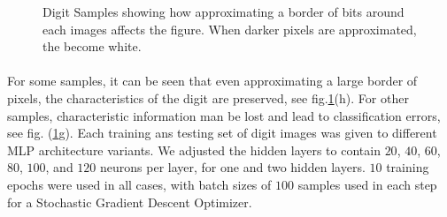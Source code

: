 \documentclass[12pt,letterpaper]{article}
\begin{document}
\begin{figure}[h]
	\caption{Digit Samples showing how approximating a border of bits around each images affects the figure. When darker pixels are approximated, the become white.}
	\label{images}
\end{figure}

\paragraph*{}For some samples, it can be seen that even approximating a large border of pixels, the characteristics of the digit are preserved, see fig.\ref{images}(h). For other samples, characteristic information man be lost and lead to classification errors, see fig. (\ref{images}g). Each training ans testing set of digit images was given to different MLP architecture variants. We adjusted the hidden layers to contain $20$, $40$, $60$, $80$, $100$, and $120$ neurons per layer, for one and two hidden layers. $10$ training epochs were used in all cases, with batch sizes of $100$ samples used in each step for a Stochastic Gradient Descent Optimizer.
\end{document}
